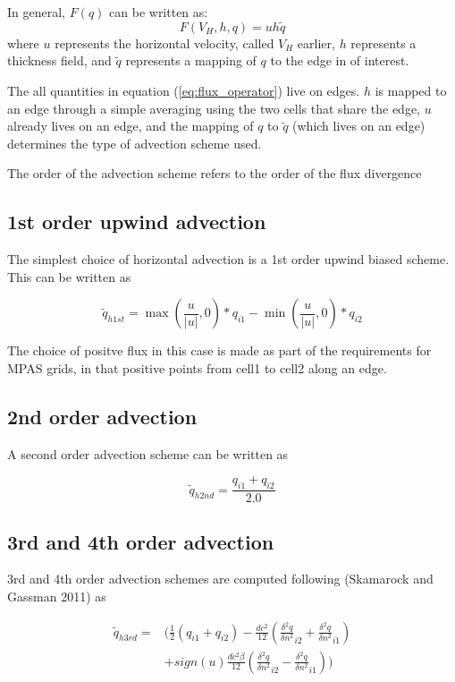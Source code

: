 \documentclass[11pt]{report}
\begin{document}
In general, $F(q)$ can be written as:
\begin{equation}
	F(V_H, h, q) = u h \tilde{q}
	\label{eq:flux_operator}
\end{equation}
where $u$ represents the horizontal velocity, called $V_H$ earlier, $h$ represents a thickness field, and $\tilde{q}$ represents a mapping of $q$ to the edge in of interest.

The all quantities in equation (\ref{eq:flux_operator}) live on edges. $h$ is mapped to an edge through a simple averaging using the two cells that share the edge, $u$ already lives on an edge, and the mapping of $q$ to $\tilde{q}$ (which lives on an edge) determines the type of advection scheme used.

The order of the advection scheme refers to the order of the flux divergence 

\subsection{1st order upwind advection }
The simplest choice of horizontal advection is a 1st order upwind biased scheme. This can be written as

\begin{equation}
	\tilde{q}_{h 1st} = \max(\frac{u}{|u|}, 0) * q_{i1} - \min(\frac{u}{|u|}, 0) * q_{i2}
\end{equation}

The choice of positve flux in this case is made as part of the requirements for MPAS grids, in that positive points from cell1 to cell2 along an edge.

\subsection{2nd order advection}
A second order advection scheme can be written as

\begin{equation}
	\tilde{q}_{h 2nd} = \frac{q_{i1} + q_{i2}}{2.0}
\end{equation}

\subsection{3rd and 4th order advection}
3rd and 4th order advection schemes are computed following (Skamarock and Gassman 2011) as

\begin{align*}
	\tilde{q}_{h 3rd} = &(\frac{1}{2}(q_{i1} + q_{i2}) - \frac{ dc^2}{12}(\frac{\delta^2 q}{\delta n^2}_{i2} + \frac{\delta^2 q}{\delta n^2}_{i1})  \\
                          &+ sign(u) \frac{ dc^2 \beta}{12}(\frac{\delta^2 q}{\delta n^2}_{i2} - \frac{\delta^2 q}{\delta n^2}_{i1}))
\end{align*} 
\end{document}
